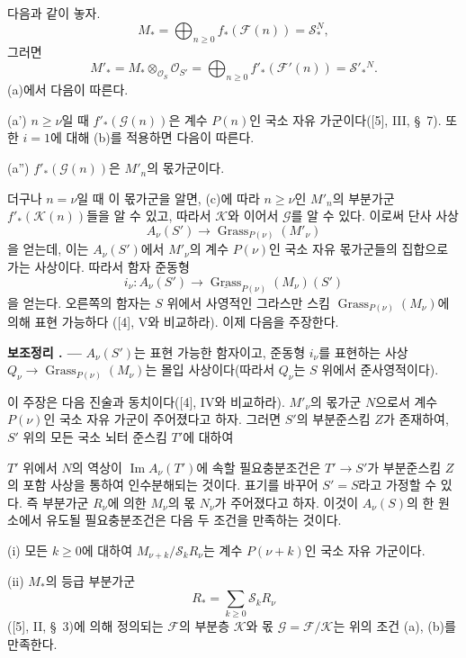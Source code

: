 \documentclass[11pt,twoside,openany]{book}
\numberwithin{equation}{section}
\newcommand{\sourceunit}{front}
\newcommand{\src}[1]{%
  \phantomsection\hypertarget{src:\sourceunit:#1}{}%
  \marginpar{\raggedleft\footnotesize\sffamily #1}%
}
\theoremstyle{plain}
\theoremstyle{definition}
\theoremstyle{remark}
\newcommand{\result}[2]{%
  \par\medskip\noindent\textbf{#1%
  \if\relax\detokenize{#2}\relax\else\space#2\fi. ---}\enspace
}
\begin{document}
다음과 같이 놓자.
\[
M_* =\bigoplus_{n\geq0}f_*(\mathcal F(n))=\mathcal S_*^{N},
\]
그러면
\[
M'_* =M_*\otimes_{\mathcal O_S}\mathcal O_{S'}
=\bigoplus_{n\geq0}f'_*(\mathcal F'(n))=\mathcal S'_*{}^{N}.
\]
(a)에서 다음이 따른다.

\noindent (a') $n\geq\nu$일 때 $f'_*(\mathcal G(n))$은 계수 $P(n)$인
국소 자유 가군이다([5], III, \S~7). 또한 $i=1$에 대해 (b)를 적용하면
다음이 따른다.

\noindent (a'') $f'_*(\mathcal G(n))$은 $M'_n$의 몫가군이다.

더구나 $n=\nu$일 때 이 몫가군을 알면, (c)에 따라 $n\geq\nu$인
$M'_n$의 부분가군 $f'_*(\mathcal K(n))$들을 알 수 있고, 따라서
$\mathcal K$와 이어서 $\mathcal G$를 알 수 있다. 이로써 단사 사상
\[
A_\nu(S')\longrightarrow\operatorname{Grass}_{P(\nu)}(M'_\nu)
\]
을 얻는데, 이는 $A_\nu(S')$에서 $M'_\nu$의 계수 $P(\nu)$인 국소 자유
몫가군들의 집합으로 가는 사상이다. 따라서 함자 준동형
\[
i_\nu:A_\nu(S')\longrightarrow
\underline{\operatorname{Grass}}_{P(\nu)}(M_\nu)(S')
\]
을 얻는다. 오른쪽의 함자는 $S$ 위에서 사영적인 그라스만 스킴
$\operatorname{Grass}_{P(\nu)}(M_\nu)$에 의해 표현 가능하다
([4], V와 비교하라). 이제 다음을 주장한다.

\result{보조정리}{3.3} $A_\nu(S')$는 표현 가능한 함자이고, 준동형
$i_\nu$를 표현하는 사상
$Q_\nu\longrightarrow\operatorname{Grass}_{P(\nu)}(M_\nu)$는
몰입 사상이다(따라서 $Q_\nu$는 $S$ 위에서 준사영적이다).

이 주장은 다음 진술과 동치이다([4], IV와 비교하라). $M'_\nu$의
몫가군 $N$으로서 계수 $P(\nu)$인 국소 자유 가군이 주어졌다고 하자.
그러면 $S'$의 부분준스킴 $Z$가 존재하여, $S'$ 위의 모든 국소 뇌터
준스킴 $T'$에 대하여
\src{262}
$T'$ 위에서 $N$의 역상이 $\operatorname{Im}A_\nu(T')$에 속할
필요충분조건은 $T'\longrightarrow S'$가 부분준스킴 $Z$의 포함 사상을
통하여 인수분해되는 것이다. 표기를 바꾸어 $S'=S$라고 가정할 수 있다.
즉 부분가군 $R_\nu$에 의한 $M_\nu$의 몫 $N_\nu$가 주어졌다고 하자.
이것이 $A_\nu(S)$의 한 원소에서 유도될 필요충분조건은 다음 두 조건을
만족하는 것이다.

\medskip
\noindent (i) 모든 $k\geq0$에 대하여
$M_{\nu+k}/\mathcal S_kR_\nu$는 계수 $P(\nu+k)$인 국소 자유 가군이다.

\smallskip
\noindent (ii) $M_*$의 등급 부분가군
\[
R_* =\sum_{k\geq0}\mathcal S_kR_\nu
\]
([5], II, \S~3)에 의해 정의되는 $\mathcal F$의 부분층 $\mathcal K$와
몫 $\mathcal G=\mathcal F/\mathcal K$는 위의 조건 (a), (b)를 만족한다.
\end{document}
